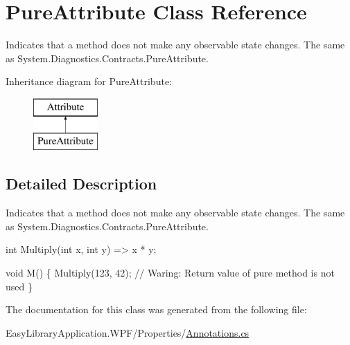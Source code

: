 \hypertarget{class_pure_attribute}{}\section{Pure\+Attribute Class Reference}
\label{class_pure_attribute}


Indicates that a method does not make any observable state changes. The same as {\ttfamily System.\+Diagnostics.\+Contracts.\+Pure\+Attribute}.  


Inheritance diagram for Pure\+Attribute\+:\begin{figure}[H]
\begin{center}
\leavevmode
\includegraphics[height=2.000000cm]{class_pure_attribute}
\end{center}
\end{figure}


\subsection{Detailed Description}
Indicates that a method does not make any observable state changes. The same as {\ttfamily System.\+Diagnostics.\+Contracts.\+Pure\+Attribute}. 


\begin{DoxyCode}
[Pure] \textcolor{keywordtype}{int} Multiply(\textcolor{keywordtype}{int} x, \textcolor{keywordtype}{int} y) => x * y;

\textcolor{keywordtype}{void} M() \{
  Multiply(123, 42); \textcolor{comment}{// Waring: Return value of pure method is not used}
\}
\end{DoxyCode}


The documentation for this class was generated from the following file\+:\begin{DoxyCompactItemize}
\item 
Easy\+Library\+Application.\+W\+P\+F/\+Properties/\mbox{\hyperlink{_annotations_8cs}{Annotations.\+cs}}\end{DoxyCompactItemize}
